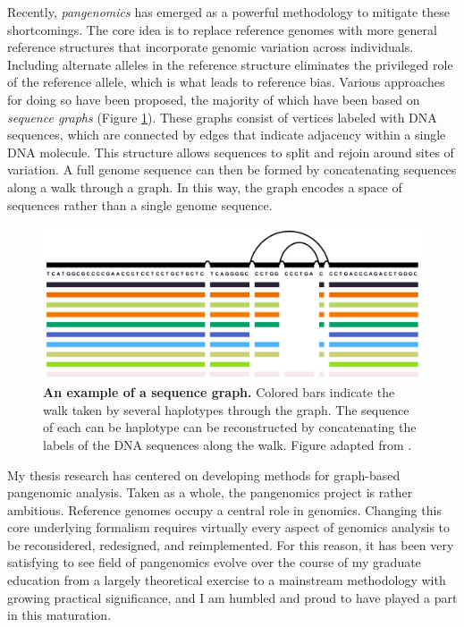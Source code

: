 \documentclass[11pt]{ucthesis}
\begin{document}
Recently, \emph{pangenomics} has emerged as a powerful methodology to mitigate these shortcomings. The core idea is to replace reference genomes with more general reference structures that incorporate genomic variation across individuals. Including alternate alleles in the reference structure eliminates the privileged role of the reference allele, which is what leads to reference bias. Various approaches for doing so have been proposed, the majority of which have been based on \emph{sequence graphs} (Figure \ref{fig:graph_example}). These graphs consist of vertices labeled with DNA sequences, which are connected by edges that indicate adjacency within a single DNA molecule. This structure allows sequences to split and rejoin around sites of variation. A full genome sequence can then be formed by concatenating sequences along a walk through a graph. In this way, the graph encodes a space of sequences rather than a single genome sequence.

\begin{figure}[h]
\begin{center}
\includegraphics[width=.75\textwidth]{introfigures/pangenome_graph.png}
\caption{\textbf{An example of a sequence graph.} Colored bars indicate the walk taken by several haplotypes through the graph. The sequence of each can be haplotype can be reconstructed by concatenating the labels of the DNA sequences along the walk. Figure adapted from \cite{Garrison_2019}.
} \label{fig:graph_example}
\end{center}
\end{figure}

My thesis research has centered on developing methods for graph-based pangenomic analysis. Taken as a whole, the pangenomics project is rather ambitious. Reference genomes occupy a central role in genomics. Changing this core underlying formalism requires virtually every aspect of genomics analysis to be reconsidered, redesigned, and reimplemented. For this reason, it has been very satisfying to see field of pangenomics evolve over the course of my graduate education from a largely theoretical exercise to a mainstream methodology with growing practical significance, and I am humbled and proud to have played a part in this maturation.
\end{document}
